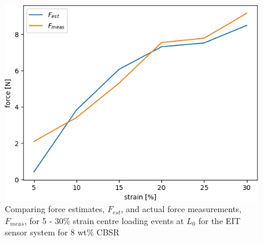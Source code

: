 \begin{figure}[H]
    \centering
    \includegraphics[width=0.7\linewidth]{Figures/CBSR_8p_1_9push_XXstrain_60s_3_force_est_frame31.jpg}
    \caption{Comparing force estimates, $F_{est}$, and actual force measurements, $F_{meas}$, for 5 - 30\% strain centre loading events at $L_0$ for the EIT sensor system for 8 wt\% CBSR}
    \label{fig:stress_est_8p_3}
\end{figure}
